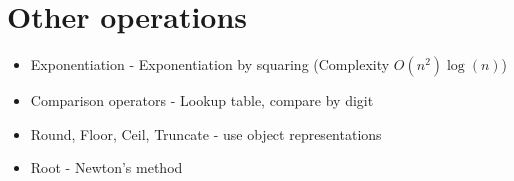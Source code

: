 \section{Other operations}

\begin{itemize}
  \item Exponentiation - Exponentiation by squaring (Complexity $O(n^2)\log(n)$)
  \item Comparison operators - Lookup table, compare by digit
  \item Round, Floor, Ceil, Truncate - use object representations
  \item Root - Newton's method
\end{itemize}